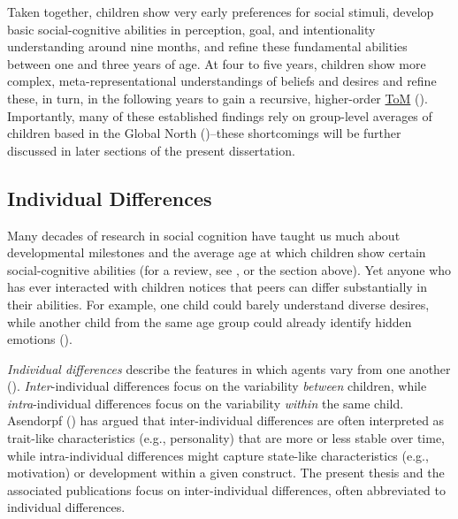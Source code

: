 \documentclass[
]{scrbook}
\begin{document}
Taken together, children show very early preferences for social stimuli, develop basic social-cognitive abilities in perception, goal, and intentionality understanding around nine months, and refine these fundamental abilities between one and three years of age. At four to five years, children show more complex, meta-representational understandings of beliefs and desires and refine these, in turn, in the following years to gain a recursive, higher-order \hyperref[acronyms_ToM]{ToM} (). Importantly, many of these established findings rely on group-level averages of children based in the Global North ()\thinspace --\thinspace these shortcomings will be further discussed in later sections of the present dissertation.

\subsection{Individual Differences}\label{individual-differences}

Many decades of research in social cognition have taught us much about developmental milestones and the average age at which children show certain social-cognitive abilities (for a review, see , or the section above). Yet anyone who has ever interacted with children notices that peers can differ substantially in their abilities. For example, one child could barely understand diverse desires, while another child from the same age group could already identify hidden emotions ().

\emph{Individual differences} describe the features in which agents vary from one another (). \emph{Inter}-individual differences focus on the variability \emph{between} children, while \emph{intra}-individual differences focus on the variability \emph{within} the same child. Asendorpf () has argued that inter-individual differences are often interpreted as trait-like characteristics (e.g., personality) that are more or less stable over time, while intra-individual differences might capture state-like characteristics (e.g., motivation) or development within a given construct. The present thesis and the associated publications focus on inter-individual differences, often abbreviated to individual differences.
\end{document}
